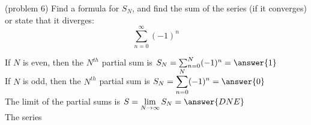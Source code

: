 \documentclass[handout]{ximera}
\begin{document}
\begin{problem}(problem 6)
Find a formula for $S_N$, and find the sum of the series (if it converges) or state that it diverges:
\[
\sum_{n=0}^\infty  (-1)^n 
\]

If $N$ is even, then the $N^{th}$ partial sum is  $S_N = \sum_{n=0}^N  (-1)^n
 =  \answer{1}$\\

If $N$ is odd, then the $N^{th}$ partial sum is  $\displaystyle S_N = \sum_{n=0}^N  (-1)^n
 =  \answer{0}$\\


The limit of the partial sums is $\displaystyle S = \lim_{N\to \infty}S_N = \answer{DNE}$\\

The series 

\end{problem}
\end{document}
